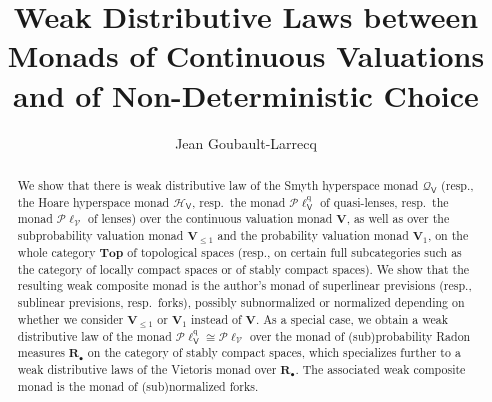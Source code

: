 \documentclass[preprint,12pt]{elsarticle}
\newcommand\Smyth{{\mathcal Q}}
\newcommand\Hoare{{\mathcal H}}
\newcommand\Vt{\mathsf{V}}
\newcommand\HV{\Hoare_\Vt}
\newcommand\SV{\Smyth_{\Vt}}
\newcommand\quasi{\mathrm{q}} %
\newcommand\QL{\Plotkin^\quasi}
\newcommand\QLV{\QL_\Vt}
\newcommand\Plotkin{\mathcal P\ell} %
\newcommand\Plotkinn{\Plotkin_{\mathcal V}}
\newcommand\Val{{\mathbf V}}
\newcommand\Topcat{\mathbf{Top}}
\begin{document}
\begin{frontmatter}



\title{Weak Distributive Laws between Monads of Continuous
  Valuations and of Non-Deterministic Choice}


\author{Jean Goubault-Larrecq}


\address{Universit\'e Paris-Saclay, CNRS, ENS Paris-Saclay,
  Laboratoire M\'ethodes
  Formelles, 91190, Gif-sur-Yvette, France.\\
  \texttt{jgl@lmf.cnrs.fr}
}

\begin{abstract}
  We show that there is weak distributive law of the Smyth hyperspace
  monad $\SV$ (resp., the Hoare hyperspace monad $\HV$, resp.\ the
  monad $\QLV$ of quasi-lenses, resp.\ the monad $\Plotkinn$ of
  lenses) over the continuous valuation monad $\Val$, as well as over
  the subprobability valuation monad $\Val_{\leq 1}$ and the
  probability valuation monad $\Val_1$, on the whole category
  $\Topcat$ of topological spaces (resp., on certain full
  subcategories such as the category of locally compact spaces or of
  stably compact spaces).  We show that the resulting weak composite
  monad is the author's monad of superlinear previsions (resp.,
  sublinear previsions, resp.\ forks), possibly subnormalized or
  normalized depending on whether we consider $\Val_{\leq 1}$ or
  $\Val_1$ instead of $\Val$.  As a special case, we obtain a weak
  distributive law of the monad $\QLV \cong \Plotkinn$ over the monad
  of (sub)probability Radon measures $\mathbf R_\bullet$ on the
  category of stably compact spaces, which specializes further to a
  weak distributive laws of the Vietoris monad over
  $\mathbf R_\bullet$.  The associated weak composite monad is the
  monad of (sub)normalized forks.
\end{abstract}


\end{frontmatter}
\end{document}
